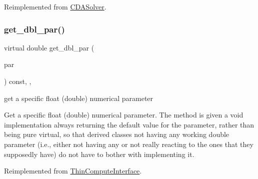 Reimplemented from \mbox{\hyperlink{class_s_m_spp__di__unipi__it_1_1_c_d_a_solver_a6d353ac3d1200d9bea89235da61bc4f3}{C\+D\+A\+Solver}}.

\mbox{\label{class_s_m_spp__di__unipi__it_1_1_m_c_f_solver_af7101b9f3e872b6ad9129ab99cff4cb7}} 
\subsubsection{\texorpdfstring{get\+\_\+dbl\+\_\+par()}{get\_dbl\_par()}}
{\footnotesize\ttfamily virtual double get\+\_\+dbl\+\_\+par (\begin{DoxyParamCaption}\item[{const \mbox{\hyperlink{class_s_m_spp__di__unipi__it_1_1_thin_compute_interface_aa3d710629ad8c434286726ad810c3b47}{idx\+\_\+type}}}]{par }\end{DoxyParamCaption}) const\hspace{0.3cm}{\ttfamily [inline]}, {\ttfamily [override]}, {\ttfamily [virtual]}}



get a specific float (double) numerical parameter 

Get a specific float (double) numerical parameter. The method is given a void implementation always returning the default value for the parameter, rather than being pure virtual, so that derived classes not having any working double parameter (i.\+e., either not having any or not really reacting to the ones that they supposedly have) do not have to bother with implementing it. 

Reimplemented from \mbox{\hyperlink{class_s_m_spp__di__unipi__it_1_1_thin_compute_interface_a16a600de08446b386bc437d8448ef44a}{Thin\+Compute\+Interface}}.

\mbox{\label{class_s_m_spp__di__unipi__it_1_1_m_c_f_solver_a465a771c115acf8d5f4e32e22f003014}} 
